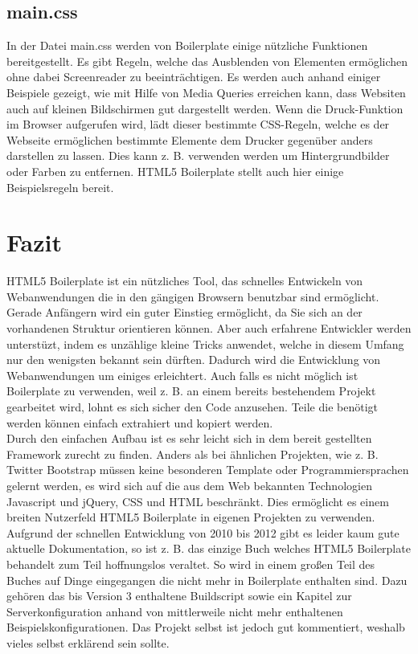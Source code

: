 \documentclass[12pt,journal,compsoc]{IEEEtran}
\begin{document}
\subsection{main.css}
In der Datei main.css werden von Boilerplate einige nützliche Funktionen bereitgestellt. Es gibt Regeln, welche das Ausblenden von Elementen ermöglichen ohne dabei Screenreader zu beeinträchtigen.
Es werden auch anhand einiger Beispiele gezeigt, wie mit Hilfe von Media Queries\cite{media} erreichen kann, dass Websiten auch auf kleinen Bildschirmen gut dargestellt werden.
Wenn die Druck-Funktion im Browser aufgerufen wird, lädt dieser bestimmte CSS-Regeln, welche es der Webseite ermöglichen bestimmte Elemente dem Drucker gegenüber anders darstellen zu lassen. Dies kann z. B. verwenden werden um Hintergrundbilder oder Farben zu entfernen. HTML5 Boilerplate stellt auch hier einige Beispielsregeln bereit. 
\section{Fazit}
HTML5 Boilerplate ist ein nützliches Tool, das schnelles Entwickeln von Webanwendungen die in den gängigen Browsern benutzbar sind ermöglicht.
Gerade Anfängern wird ein guter Einstieg ermöglicht, da Sie sich an der vorhandenen Struktur orientieren können. 
Aber auch erfahrene Entwickler werden unterstüzt, indem es unzählige kleine Tricks anwendet, welche in diesem Umfang nur den wenigsten bekannt sein dürften.
Dadurch wird die Entwicklung von Webanwendungen um einiges erleichtert.
Auch falls es nicht möglich ist Boilerplate zu verwenden, weil z. B. an einem bereits bestehendem Projekt gearbeitet wird,
lohnt es sich sicher den Code anzusehen. Teile die benötigt werden können einfach extrahiert und kopiert werden.
\\
Durch den einfachen Aufbau ist es sehr leicht sich in dem bereit gestellten Framework zurecht zu finden.
Anders als bei ähnlichen Projekten, wie z. B. Twitter Bootstrap\cite{bootstrap} müssen keine besonderen Template oder Programmiersprachen gelernt werden, es wird sich auf die aus dem Web bekannten
Technologien Javascript und jQuery, CSS und HTML beschränkt. Dies ermöglicht es einem breiten Nutzerfeld HTML5 Boilerplate in eigenen Projekten zu verwenden. 
\\
Aufgrund der schnellen Entwicklung von 2010 bis 2012 gibt es leider kaum gute aktuelle Dokumentation, so ist z. B. das einzige Buch\cite{buch} welches HTML5 Boilerplate behandelt zum Teil hoffnungslos veraltet. So wird in einem großen Teil des Buches auf Dinge eingegangen die nicht mehr in Boilerplate enthalten sind. Dazu gehören das bis Version 3 enthaltene Buildscript sowie ein Kapitel zur Serverkonfiguration anhand von mittlerweile nicht mehr enthaltenen Beispielskonfigurationen. Das Projekt selbst ist jedoch gut kommentiert, weshalb vieles selbst erklärend sein sollte.



\end{document}
